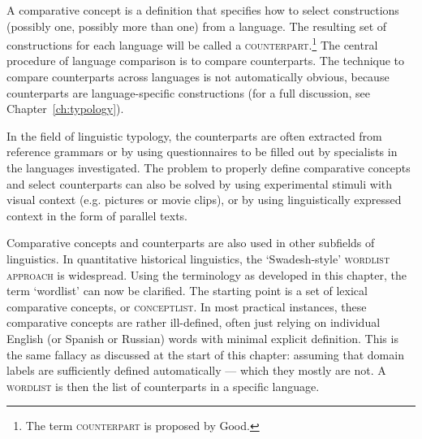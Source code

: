 
%
A comparative concept is a definition that specifies how to select constructions (possibly one, possibly more than one) from a language. The resulting set of constructions for each language will be called a \textsc{counterpart}.\footnote{The term \textsc{counterpart} is proposed by Good.} The central procedure of language comparison is to compare counterparts. The technique to compare counterparts across languages is not automatically obvious, because counterparts are language-specific constructions (for a full discussion, see Chapter~\ref{ch:typology}).

In the field of linguistic typology, the counterparts are often extracted from reference grammars or by using questionnaires to be filled out by specialists in the  languages investigated. The problem to properly define comparative concepts and select counterparts can also be solved by using experimental stimuli with visual context (e.g. pictures or movie clips), or by using linguistically expressed context in the form of parallel texts.

Comparative concepts and counterparts are also used in other subfields of linguistics. In quantitative historical linguistics, the `Swadesh-style' \textsc{wordlist approach} is widespread. Using the terminology as developed in this chapter, the term `wordlist' can now be clarified. The starting point is a set of lexical comparative concepts, or \textsc{conceptlist}. In most practical instances, these comparative concepts are rather ill-defined, often just relying on individual English (or Spanish or Russian) words with minimal explicit definition. This is the same fallacy as discussed at the start of this chapter: assuming that domain labels are sufficiently defined automatically --- which they mostly are not. A \textsc{wordlist} is then the list of counterparts in a specific language.
